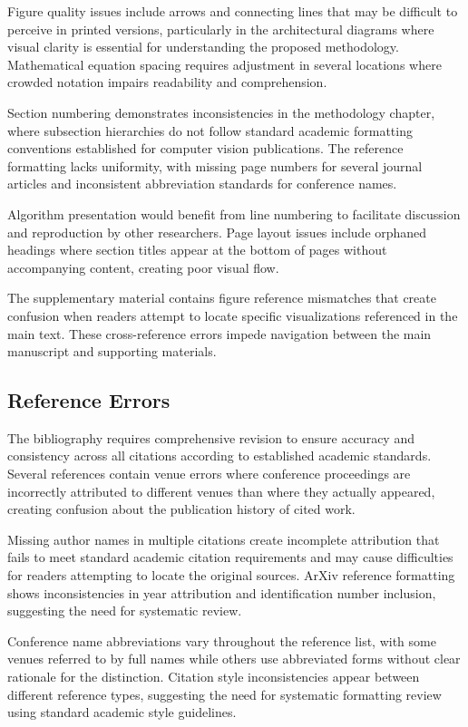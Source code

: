 Figure quality issues include arrows and connecting lines that may be difficult to perceive in printed versions, particularly in the architectural diagrams where visual clarity is essential for understanding the proposed methodology. Mathematical equation spacing requires adjustment in several locations where crowded notation impairs readability and comprehension.

Section numbering demonstrates inconsistencies in the methodology chapter, where subsection hierarchies do not follow standard academic formatting conventions established for computer vision publications. The reference formatting lacks uniformity, with missing page numbers for several journal articles and inconsistent abbreviation standards for conference names.

Algorithm presentation would benefit from line numbering to facilitate discussion and reproduction by other researchers. Page layout issues include orphaned headings where section titles appear at the bottom of pages without accompanying content, creating poor visual flow.

The supplementary material contains figure reference mismatches that create confusion when readers attempt to locate specific visualizations referenced in the main text. These cross-reference errors impede navigation between the main manuscript and supporting materials.

\subsection{Reference Errors}
The bibliography requires comprehensive revision to ensure accuracy and consistency across all citations according to established academic standards. Several references contain venue errors where conference proceedings are incorrectly attributed to different venues than where they actually appeared, creating confusion about the publication history of cited work.

Missing author names in multiple citations create incomplete attribution that fails to meet standard academic citation requirements and may cause difficulties for readers attempting to locate the original sources. ArXiv reference formatting shows inconsistencies in year attribution and identification number inclusion, suggesting the need for systematic review.

Conference name abbreviations vary throughout the reference list, with some venues referred to by full names while others use abbreviated forms without clear rationale for the distinction. Citation style inconsistencies appear between different reference types, suggesting the need for systematic formatting review using standard academic style guidelines.

